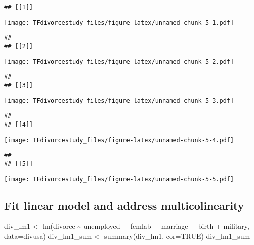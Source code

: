 \documentclass[
]{article}
\newenvironment{Shaded}{\begin{snugshade}}{\end{snugshade}}
\newcommand{\AttributeTok}[1]{\textcolor[rgb]{0.77,0.63,0.00}{#1}}
\newcommand{\ConstantTok}[1]{\textcolor[rgb]{0.00,0.00,0.00}{#1}}
\newcommand{\FunctionTok}[1]{\textcolor[rgb]{0.00,0.00,0.00}{#1}}
\newcommand{\NormalTok}[1]{#1}
\newcommand{\OtherTok}[1]{\textcolor[rgb]{0.56,0.35,0.01}{#1}}
\newcommand{\SpecialCharTok}[1]{\textcolor[rgb]{0.00,0.00,0.00}{#1}}
\begin{document}
\begin{verbatim}
## [[1]]
\end{verbatim}

\texttt{[image: TFdivorcestudy\_files/figure-latex/unnamed-chunk-5-1.pdf]}

\begin{verbatim}
## 
## [[2]]
\end{verbatim}

\texttt{[image: TFdivorcestudy\_files/figure-latex/unnamed-chunk-5-2.pdf]}

\begin{verbatim}
## 
## [[3]]
\end{verbatim}

\texttt{[image: TFdivorcestudy\_files/figure-latex/unnamed-chunk-5-3.pdf]}

\begin{verbatim}
## 
## [[4]]
\end{verbatim}

\texttt{[image: TFdivorcestudy\_files/figure-latex/unnamed-chunk-5-4.pdf]}

\begin{verbatim}
## 
## [[5]]
\end{verbatim}

\texttt{[image: TFdivorcestudy\_files/figure-latex/unnamed-chunk-5-5.pdf]}

\hypertarget{fit-linear-model-and-address-multicolinearity}{%
\subsection{Fit linear model and address
multicolinearity}\label{fit-linear-model-and-address-multicolinearity}}

\begin{Shaded}
\begin{Highlighting}[]
\NormalTok{div\_lm1 }\OtherTok{\textless{}{-}} \FunctionTok{lm}\NormalTok{(divorce }\SpecialCharTok{\textasciitilde{}}\NormalTok{ unemployed }\SpecialCharTok{+}\NormalTok{ femlab }\SpecialCharTok{+}\NormalTok{ marriage }\SpecialCharTok{+}\NormalTok{ birth }\SpecialCharTok{+}\NormalTok{ military, }\AttributeTok{data=}\NormalTok{divusa)}
\NormalTok{div\_lm1\_sum }\OtherTok{\textless{}{-}} \FunctionTok{summary}\NormalTok{(div\_lm1, }\AttributeTok{cor=}\ConstantTok{TRUE}\NormalTok{)}
\NormalTok{div\_lm1\_sum}
\end{Highlighting}
\end{Shaded}
\end{document}
